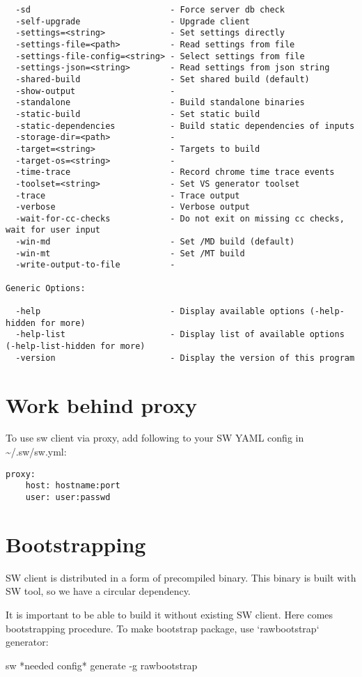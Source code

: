 \begin{verbatim}
  -sd                            - Force server db check
  -self-upgrade                  - Upgrade client
  -settings=<string>             - Set settings directly
  -settings-file=<path>          - Read settings from file
  -settings-file-config=<string> - Select settings from file
  -settings-json=<string>        - Read settings from json string
  -shared-build                  - Set shared build (default)
  -show-output                   -
  -standalone                    - Build standalone binaries
  -static-build                  - Set static build
  -static-dependencies           - Build static dependencies of inputs
  -storage-dir=<path>            -
  -target=<string>               - Targets to build
  -target-os=<string>            -
  -time-trace                    - Record chrome time trace events
  -toolset=<string>              - Set VS generator toolset
  -trace                         - Trace output
  -verbose                       - Verbose output
  -wait-for-cc-checks            - Do not exit on missing cc checks, wait for user input
  -win-md                        - Set /MD build (default)
  -win-mt                        - Set /MT build
  -write-output-to-file          -

Generic Options:

  -help                          - Display available options (-help-hidden for more)
  -help-list                     - Display list of available options (-help-list-hidden for more)
  -version                       - Display the version of this program
\end{verbatim}


\section{Work behind proxy}

To use sw client via proxy, add following to your SW YAML config in
\textasciitilde/.sw/sw.yml:
\begin{verbatim}
proxy:
    host: hostname:port
    user: user:passwd
\end{verbatim}

\section{Bootstrapping}

SW client is distributed in a form of precompiled binary.
This binary is built with SW tool, so we have a circular dependency.

It is important to be able to build it without existing SW client.
Here comes bootstrapping procedure.
To make bootstrap package, use `rawbootstrap` generator:
\begin{command}
sw *needed config* generate -g rawbootstrap
\end{command}






